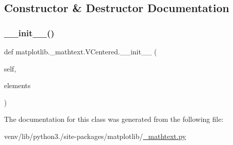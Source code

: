 \subsection{Constructor \& Destructor Documentation}
\mbox{\label{classmatplotlib_1_1__mathtext_1_1VCentered_ab797cc5814e01062a925479f8decad6a}} 
\subsubsection{\texorpdfstring{\+\_\+\+\_\+init\+\_\+\+\_\+()}{\_\_init\_\_()}}
{\footnotesize\ttfamily def matplotlib.\+\_\+mathtext.\+V\+Centered.\+\_\+\+\_\+init\+\_\+\+\_\+ (\begin{DoxyParamCaption}\item[{}]{self,  }\item[{}]{elements }\end{DoxyParamCaption})}



The documentation for this class was generated from the following file\+:\begin{DoxyCompactItemize}
\item 
venv/lib/python3./site-\/packages/matplotlib/\hyperlink{__mathtext_8py}{\+\_\+mathtext.\+py}\end{DoxyCompactItemize}
